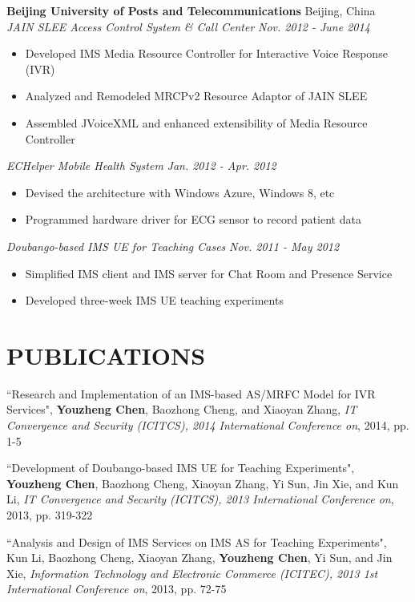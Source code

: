 \documentclass[margin]{res}
\begin{document}
\begin{resume}
{\bf Beijing University of Posts and Telecommunications} \hfill Beijing, China \\[8pt]
{\em JAIN SLEE Access Control System \& Call Center} \hfill {\em Nov. 2012 - June 2014} \\[-8pt]
\begin{itemize}[topsep=-1pt,parsep=0pt]
\item Developed IMS Media Resource Controller for Interactive Voice Response (IVR)
\item Analyzed and Remodeled MRCPv2 Resource Adaptor of JAIN SLEE
\item Assembled JVoiceXML and enhanced extensibility of Media Resource Controller
\end{itemize}

{\em ECHelper Mobile Health System} \hfill {\em Jan. 2012 - Apr. 2012} \\[-8pt]
\begin{itemize}[topsep=-1pt,parsep=1pt]
\item Devised the architecture with Windows Azure, Windows 8, etc
\item Programmed hardware driver for ECG sensor to record patient data
\end{itemize}

{\em Doubango-based IMS UE for Teaching Cases} \hfill {\em Nov. 2011 - May 2012} \\[-8pt]
\begin{itemize}[topsep=-1pt,parsep=1pt]
\item Simplified IMS client and IMS server for Chat Room and Presence Service
\item Developed three-week IMS UE teaching experiments
\end{itemize}

\section{PUBLICATIONS}
``Research and Implementation of an IMS-based AS/MRFC Model for IVR Services", {\bf Youzheng Chen}, Baozhong Cheng, and Xiaoyan Zhang, {\em IT Convergence and Security (ICITCS), 2014 International Conference on}, 2014, pp. 1-5

``Development of Doubango-based IMS UE for Teaching Experiments", {\bf Youzheng Chen}, Baozhong Cheng, Xiaoyan Zhang, Yi Sun, Jin Xie, and Kun Li, {\em IT Convergence and Security (ICITCS), 2013 International Conference on}, 2013, pp. 319-322

``Analysis and Design of IMS Services on IMS AS for Teaching Experiments", Kun Li, Baozhong Cheng, Xiaoyan Zhang, {\bf Youzheng Chen}, Yi Sun, and Jin Xie, {\em Information Technology and Electronic Commerce (ICITEC), 2013 1st International Conference on}, 2013, pp. 72-75


\end{resume}
\end{document}
